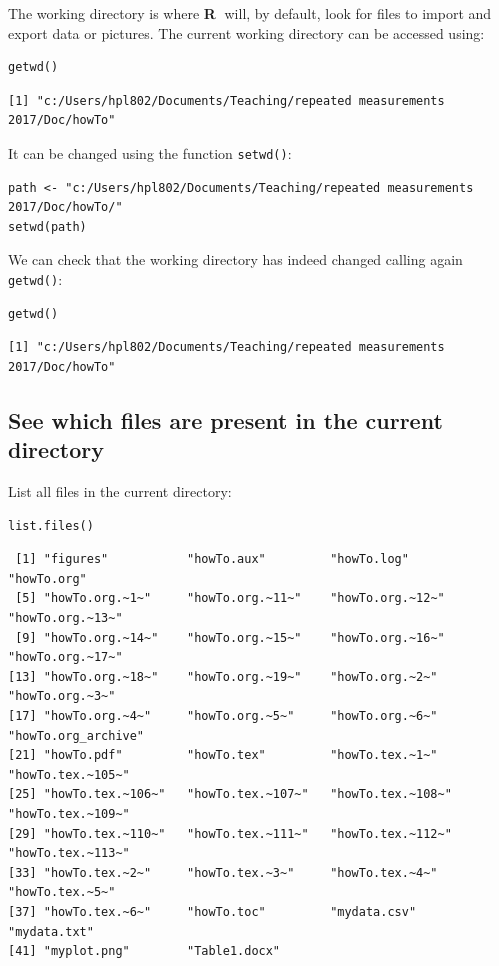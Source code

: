 \documentclass{article}
\newcommand\Rlogo{\textbf{\textsf{R}}\xspace}
\begin{document}
The working directory is where \Rlogo \(\;\) will, by default, look for files
to import and export data or pictures. The current working directory
can be accessed using:
\lstset{language=r,label= ,caption= ,captionpos=b,numbers=none}
\begin{lstlisting}
getwd()
\end{lstlisting}

\begin{verbatim}
[1] "c:/Users/hpl802/Documents/Teaching/repeated measurements 2017/Doc/howTo"
\end{verbatim}

It can be changed using the function \texttt{setwd()}:
\lstset{language=r,label= ,caption= ,captionpos=b,numbers=none}
\begin{lstlisting}
path <- "c:/Users/hpl802/Documents/Teaching/repeated measurements 2017/Doc/howTo/"
setwd(path)
\end{lstlisting}

We can check that the working directory has indeed changed calling
again \texttt{getwd()}:
\lstset{language=r,label= ,caption= ,captionpos=b,numbers=none}
\begin{lstlisting}
getwd()
\end{lstlisting}

\begin{verbatim}
[1] "c:/Users/hpl802/Documents/Teaching/repeated measurements 2017/Doc/howTo"
\end{verbatim}

\subsection{See which files are present in the current directory}
\label{sec:orgdf108fa}

List all files in the current directory:
\lstset{language=r,label= ,caption= ,captionpos=b,numbers=none}
\begin{lstlisting}
list.files()
\end{lstlisting}

\begin{verbatim}
 [1] "figures"           "howTo.aux"         "howTo.log"         "howTo.org"        
 [5] "howTo.org.~1~"     "howTo.org.~11~"    "howTo.org.~12~"    "howTo.org.~13~"   
 [9] "howTo.org.~14~"    "howTo.org.~15~"    "howTo.org.~16~"    "howTo.org.~17~"   
[13] "howTo.org.~18~"    "howTo.org.~19~"    "howTo.org.~2~"     "howTo.org.~3~"    
[17] "howTo.org.~4~"     "howTo.org.~5~"     "howTo.org.~6~"     "howTo.org_archive"
[21] "howTo.pdf"         "howTo.tex"         "howTo.tex.~1~"     "howTo.tex.~105~"  
[25] "howTo.tex.~106~"   "howTo.tex.~107~"   "howTo.tex.~108~"   "howTo.tex.~109~"  
[29] "howTo.tex.~110~"   "howTo.tex.~111~"   "howTo.tex.~112~"   "howTo.tex.~113~"  
[33] "howTo.tex.~2~"     "howTo.tex.~3~"     "howTo.tex.~4~"     "howTo.tex.~5~"    
[37] "howTo.tex.~6~"     "howTo.toc"         "mydata.csv"        "mydata.txt"       
[41] "myplot.png"        "Table1.docx"
\end{verbatim}
\end{document}
